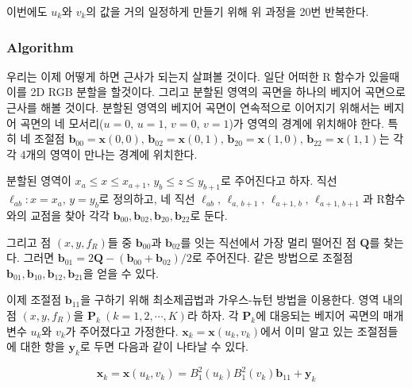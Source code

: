 \documentclass{gshs_thesis}
\theoremstyle{theorem}
\theoremstyle{lemma}
\theoremstyle{definition}
\begin{document}
이번에도 $u_k$와 $v_k$의 값을 거의 일정하게 만들기 위해 위 과정을 20번 반복한다. \\

\subsubsection{Algorithm}
우리는 이제 어떻게 하면 근사가 되는지 살펴볼 것이다. 일단 어떠한 R 함수가 있을때 이를 2D RGB 분할을 할것이다. 그리고 분할된 영역의 곡면을 하나의 베지어 곡면으로 근사를 해볼 것이다. 분할된 영역의 베지어 곡면이 연속적으로 이어지기 위해서는 베지어 곡면의 네 모서리($u=0, \, u=1, \, v=0, \, v=1$)가 영역의 경계에 위치해야 한다. 특히 네 조절점 $\mathbf{b}_{00} = \mathbf{x}(0, 0), \, \mathbf{b}_{02} = \mathbf{x}(0, 1), \, \mathbf{b}_{20} = \mathbf{x}(1, 0), \, \mathbf{b}_{22} = \mathbf{x}(1, 1)$는 각각 4개의 영역이 만나는 경계에 위치한다. 

분할된 영역이 $x_{a} \leq x \leq x_{a+1}, \, y_{b} \leq z \leq y_{b+1}$로 주어진다고 하자. 직선 $\ell_{ab} \colon x = x_{a}, \, y = y_{b}$로 정의하고, 네 직선 $\ell_{ab}, \, \ell_{a, \, b+1}, \, \ell_{a+1, \, b}, \, \ell_{a+1, \, b+1}$과 R함수와의 교점을 찾아 각각 $\mathbf{b}_{00}, \mathbf{b}_{02}, \mathbf{b}_{20}, \mathbf{b}_{22}$로 둔다. 

그리고 점 $(x,y,f_{R})$들 중 $\mathbf{b}_{00}$과 $\mathbf{b}_{02}$를 잇는 직선에서 가장 멀리 떨어진 점 $\mathbf{Q}$를 찾는다. 그러면 $\mathbf{b}_{01} = 2\mathbf{Q} - (\mathbf{b}_{00} + \mathbf{b}_{02})/2$로 주어진다. 같은 방법으로 조절점 $\mathbf{b}_{01}, \mathbf{b}_{10}, \mathbf{b}_{12}, \mathbf{b}_{21}$을 얻을 수 있다. 

이제 조절점 $\mathbf{b}_{11}$을 구하기 위해 최소제곱법과 가우스-뉴턴 방법을 이용한다. 영역 내의 점 $(x,y,f_{R})$을 $\mathbf{P}_k \ (k=1, 2, \cdots, K)$라 하자. 각 $\mathbf{P}_k$에 대응되는 베지어 곡면의 매개변수 $u_k$와 $v_k$가 주어졌다고 가정한다. $\mathbf{x}_k = \mathbf{x}(u_k, v_k)$에서 이미 알고 있는 조절점들에 대한 항을 $\mathbf{y}_k$로 두면 다음과 같이 나타날 수 있다.

$$ \mathbf{x}_k = \mathbf{x}(u_k, v_k) = B_1^2(u_k) B_1^2(v_k) \mathbf{b}_{11} + \mathbf{y}_k $$ 
\end{document}
